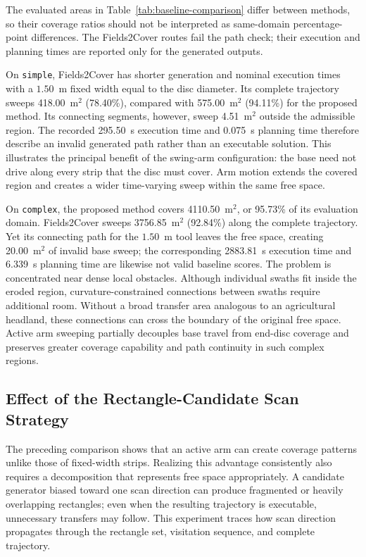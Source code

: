 The evaluated areas in Table~\ref{tab:baseline-comparison} differ between methods, so their coverage ratios should not be interpreted as same-domain percentage-point differences. The Fields2Cover routes fail the path check; their execution and planning times are reported only for the generated outputs.

On \texttt{simple}, Fields2Cover has shorter generation and nominal execution times with a $1.50$~m fixed width equal to the disc diameter. Its complete trajectory sweeps 418.00~m$^2$ (78.40\%), compared with 575.00~m$^2$ (94.11\%) for the proposed method. Its connecting segments, however, sweep 4.51~m$^2$ outside the admissible region. The recorded 295.50~s execution time and 0.075~s planning time therefore describe an invalid generated path rather than an executable solution. This illustrates the principal benefit of the swing-arm configuration: the base need not drive along every strip that the disc must cover. Arm motion extends the covered region and creates a wider time-varying sweep within the same free space.

On \texttt{complex}, the proposed method covers 4110.50~m$^2$, or 95.73\% of its evaluation domain. Fields2Cover sweeps 3756.85~m$^2$ (92.84\%) along the complete trajectory. Yet its connecting path for the $1.50$~m tool leaves the free space, creating 20.00~m$^2$ of invalid base sweep; the corresponding 2883.81~s execution time and 6.339~s planning time are likewise not valid baseline scores. The problem is concentrated near dense local obstacles. Although individual swaths fit inside the eroded region, curvature-constrained connections between swaths require additional room. Without a broad transfer area analogous to an agricultural headland, these connections can cross the boundary of the original free space. Active arm sweeping partially decouples base travel from end-disc coverage and preserves greater coverage capability and path continuity in such complex regions.

\subsection{Effect of the Rectangle-Candidate Scan Strategy}

The preceding comparison shows that an active arm can create coverage patterns unlike those of fixed-width strips. Realizing this advantage consistently also requires a decomposition that represents free space appropriately. A candidate generator biased toward one scan direction can produce fragmented or heavily overlapping rectangles; even when the resulting trajectory is executable, unnecessary transfers may follow. This experiment traces how scan direction propagates through the rectangle set, visitation sequence, and complete trajectory.

